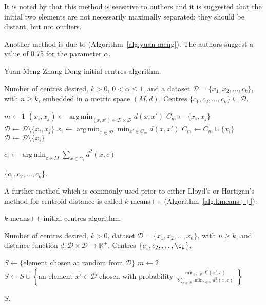 \documentclass[a4paper]{report}
\DeclareMathOperator*{\argmin}{arg\,min}
\newcommand{\dset}{\mathcal{D}}
\begin{document}
It is noted by \citet{degroot1999selecting} that this method is sensitive to
outliers and it is suggested that the initial two elements are not necessarily
maximally separated; they should be distant, but not outliers.

Another method is due to \citet{yuan04initial}
(Algorithm~\ref{alg:yuan-meng}).  The authors suggest a value of 0.75 for the
parameter $\alpha$.

\begin{algorithm}
  \caption{Yuan-Meng-Zhang-Dong initial centres algorithm.}
  \label{alg:yuan-meng}

  \begin{algorithmic}
    \Require Number of centres desired, $k > 0$, $0 < \alpha \leq 1$, and a
             dataset $\dset = \{x_1,x_2,\dotsc,c_k\}$, with $n \geq k$,
             embedded in a metric space $(M,d)$.
    \Ensure Centres $\{c_1,c_2,\dotsc,c_k\} \subseteq \dset$.

    \State $m \gets 1$
       \State $\displaystyle (x_i,x_j) \gets
               \argmin_{(x,x') \in \dset \times \dset} d(x,x')$
       \State $C_m \gets \{x_i,x_j\}$
       \State $\dset \gets \dset \setminus \{x_i,x_j\}$
          \State $\displaystyle x_i \gets
                  \argmin_{x \in \dset} \min_{x' \in C_m} d(x,x')$
          \State $C_m \gets C_m \cup \{x_i\}$
          \State $\dset \gets \dset \setminus \{x_i\}$
       \EndWhile
    \EndWhile

       \State $\displaystyle c_i \gets
               \argmin_{c \in M} \sum_{x \in C_i} d^2(x,c)$
    \EndFor

    \State \Return $\{c_1,c_2,\dotsc,c_k\}$.
  \end{algorithmic}
\end{algorithm}

A further method which is commonly used prior to either Lloyd's or Hartigan's
method for centroid-distance is called $k$-means++
(Algorithm~\ref{alg:kmeans++}).

\begin{algorithm}
  \caption{$k$-means++ initial centres algorithm.}
  \label{alg:kmeans++}

  \begin{algorithmic}
    \Require Number of centres desired, $k > 0$, dataset $\dset =
             \{x_1,x_2,\dotsc,x_n\}$, with $n \geq k$, and distance function
             $d \colon \dset \times \dset \to \mathbb{R}^+$.
    \Ensure Centres $\{c_1,c_2,\dotsc,\c_k\}$.

    \State $S \gets \{\text{element chosen at random from $\dset$}\}$
    \State $m \gets 2$
       \State $\displaystyle S \gets S \cup
               \left\{\text{an element $x' \in \dset$ chosen with probability
                            $\frac{\displaystyle \min_{c \in S} d^2(x',c)}
                             {\displaystyle
                              \sum_{x \in \dset} \min_{c \in S} d^2(x,c)}$
                            }\right\}$
    \EndWhile

    \State \Return $S$.
  \end{algorithmic}
\end{algorithm}
\end{document}
